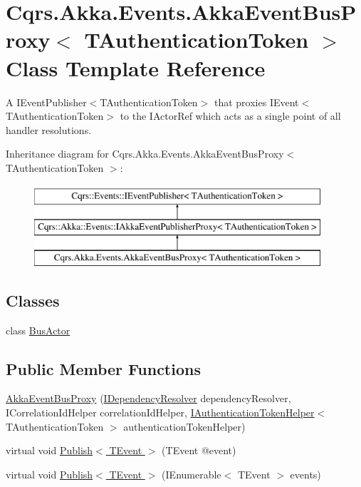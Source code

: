\hypertarget{classCqrs_1_1Akka_1_1Events_1_1AkkaEventBusProxy}{}\section{Cqrs.\+Akka.\+Events.\+Akka\+Event\+Bus\+Proxy$<$ T\+Authentication\+Token $>$ Class Template Reference}
\label{classCqrs_1_1Akka_1_1Events_1_1AkkaEventBusProxy}


A I\+Event\+Publisher$<$\+T\+Authentication\+Token$>$ that proxies I\+Event$<$\+T\+Authentication\+Token$>$ to the I\+Actor\+Ref which acts as a single point of all handler resolutions.  


Inheritance diagram for Cqrs.\+Akka.\+Events.\+Akka\+Event\+Bus\+Proxy$<$ T\+Authentication\+Token $>$\+:\begin{figure}[H]
\begin{center}
\leavevmode
\includegraphics[height=3.000000cm]{classCqrs_1_1Akka_1_1Events_1_1AkkaEventBusProxy}
\end{center}
\end{figure}
\subsection*{Classes}
\begin{DoxyCompactItemize}
\item 
class \hyperlink{classCqrs_1_1Akka_1_1Events_1_1AkkaEventBusProxy_1_1BusActor}{Bus\+Actor}
\end{DoxyCompactItemize}
\subsection*{Public Member Functions}
\begin{DoxyCompactItemize}
\item 
\hyperlink{classCqrs_1_1Akka_1_1Events_1_1AkkaEventBusProxy_a2f886b4e9e64188fe69478c39c96f2b5_a2f886b4e9e64188fe69478c39c96f2b5}{Akka\+Event\+Bus\+Proxy} (\hyperlink{interfaceCqrs_1_1Configuration_1_1IDependencyResolver}{I\+Dependency\+Resolver} dependency\+Resolver, I\+Correlation\+Id\+Helper correlation\+Id\+Helper, \hyperlink{interfaceCqrs_1_1Authentication_1_1IAuthenticationTokenHelper}{I\+Authentication\+Token\+Helper}$<$ T\+Authentication\+Token $>$ authentication\+Token\+Helper)
\item 
virtual void \hyperlink{classCqrs_1_1Akka_1_1Events_1_1AkkaEventBusProxy_a656daead2fe6f30487855dbaea5a3c83_a656daead2fe6f30487855dbaea5a3c83}{Publish$<$ T\+Event $>$} (T\+Event @event)
\item 
virtual void \hyperlink{classCqrs_1_1Akka_1_1Events_1_1AkkaEventBusProxy_af4c202eaab00ed2fb6160d5b114d935c_af4c202eaab00ed2fb6160d5b114d935c}{Publish$<$ T\+Event $>$} (I\+Enumerable$<$ T\+Event $>$ events)
\end{DoxyCompactItemize}
